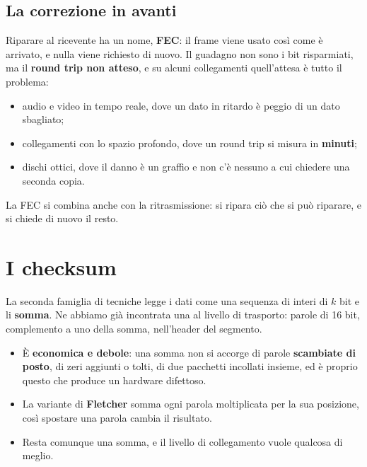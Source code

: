 \subsection{La correzione in avanti}

Riparare al ricevente ha un nome, \textbf{FEC}: il frame viene usato così come è arrivato, e nulla viene richiesto di nuovo. Il
guadagno non sono i bit risparmiati, ma il \textbf{round trip non atteso}, e su alcuni collegamenti quell'attesa è tutto il problema:

\begin{itemize}
    \item audio e video in tempo reale, dove un dato in ritardo è peggio di un dato sbagliato;
    \item collegamenti con lo spazio profondo, dove un round trip si misura in \textbf{minuti};
    \item dischi ottici, dove il danno è un graffio e non c'è nessuno a cui chiedere una seconda copia.
\end{itemize}

La FEC si combina anche con la ritrasmissione: si ripara ciò che si può riparare, e si chiede di nuovo il resto.

\section{I checksum}

La seconda famiglia di tecniche legge i dati come una sequenza di interi di $k$ bit e li \textbf{somma}. Ne abbiamo già incontrata una
al livello di trasporto: parole di 16 bit, complemento a uno della somma, nell'header del segmento.

\begin{itemize}
    \item È \textbf{economica e debole}: una somma non si accorge di parole \textbf{scambiate di posto}, di zeri aggiunti o tolti, di
          due pacchetti incollati insieme, ed è proprio questo che produce un hardware difettoso.
    \item La variante di \textbf{Fletcher} somma ogni parola moltiplicata per la sua posizione, così spostare una parola cambia il
          risultato.
    \item Resta comunque una somma, e il livello di collegamento vuole qualcosa di meglio.
\end{itemize}

